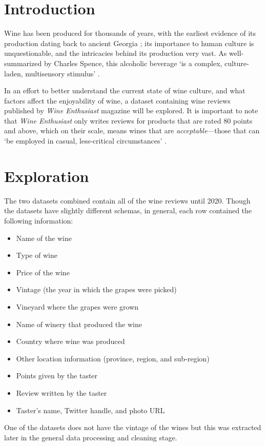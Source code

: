% 
\section{Introduction}
Wine has been produced for thousands of years, with the earliest evidence of its production dating back to ancient Georgia \cite{McGovernJalabadze2017}; its importance to human culture is unquestionable, and the intricacies behind its production very vast. As well-summarized by Charles Spence, this alcoholic beverage `is a complex, culture-laden, multisensory stimulus' \cite{Spence2020}.

In an effort to better understand the current state of wine culture, and what factors affect the enjoyability of wine, a dataset containing wine reviews published by \emph{Wine Enthusiast} magazine will be explored. It is important to note that \emph{Wine Enthusiast} only writes reviews for products that are rated 80 points and above, which on their scale, means wines that are \emph{acceptable}---those that can `be employed in casual, less-critical circumstances' \cite{WineMag}. %



\section{Exploration}
The two datasets combined contain all of the wine reviews until 2020. Though the datasets have slightly different schemas, in general, each row contained the following information:
\begin{itemize}
    \setlength\itemsep{0.1em}
    \item Name of the wine
    \item Type of wine
    \item Price of the wine
    \item Vintage (the year in which the grapes were picked)
    \item Vineyard where the grapes were grown
    \item Name of winery that produced the wine
    \item Country where wine was produced
    \item Other location information (province, region, and sub-region)
    \item Points given by the taster
    \item Review written by the taster
    \item Taster's name, Twitter handle, and photo URL
\end{itemize}
One of the datasets does not have the vintage of the wines but this was extracted later in the general data processing and cleaning stage.


